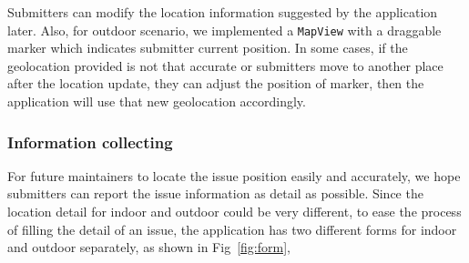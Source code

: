 \documentclass{acm_proc_article-sp}
\begin{document}
 Submitters can modify the location information suggested by the application later. Also, for outdoor scenario, 
 we implemented a \texttt{MapView} with a draggable marker which indicates submitter current position. 
 In some cases, if the geolocation provided is not that accurate or submitters move to another place after the location update, 
 they can adjust the position of marker, then the application will use that new geolocation accordingly.
 
 \subsubsection{Information collecting}
 For future maintainers to locate the issue position easily and accurately, we hope submitters can report the issue information
 as detail as possible. Since the location detail for indoor and outdoor could be very different, to ease the process of filling the detail
 of an issue, the application has two different forms for indoor and outdoor separately, as shown in Fig~\ref{fig:form}, 
\end{document}
